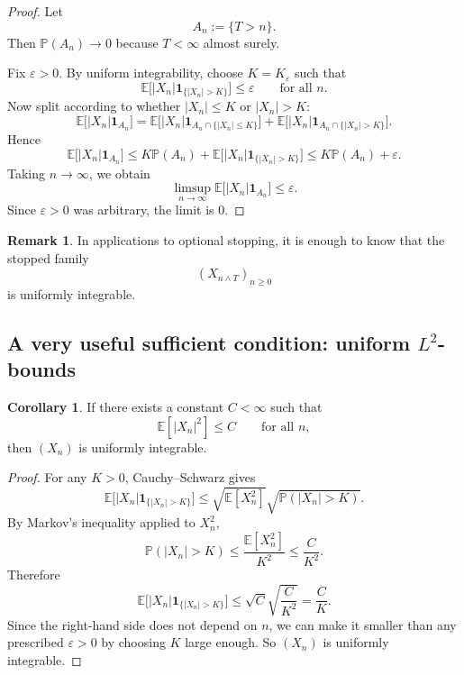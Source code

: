 \documentclass[11pt]{article}
\theoremstyle{definition}
\newtheorem{remark}[theorem]{Remark}
\newtheorem{corollary}[theorem]{Corollary}
\begin{document}
\begin{proof}
Let
\[
A_n:=\{T>n\}.
\]
Then \(\mathbb P(A_n)\to 0\) because \(T<\infty\) almost surely.

Fix \(\varepsilon>0\). By uniform integrability, choose \(K=K_\varepsilon\) such that
\[
\mathbb E\bigl[|X_n|\mathbf 1_{\{|X_n|>K\}}\bigr]\le \varepsilon
\qquad \text{for all } n.
\]
Now split according to whether \(|X_n|\le K\) or \(|X_n|>K\):
\[
\mathbb E\bigl[|X_n|\mathbf 1_{A_n}\bigr]
=
\mathbb E\bigl[|X_n|\mathbf 1_{A_n\cap\{|X_n|\le K\}}\bigr]
+
\mathbb E\bigl[|X_n|\mathbf 1_{A_n\cap\{|X_n|>K\}}\bigr].
\]
Hence
\[
\mathbb E\bigl[|X_n|\mathbf 1_{A_n}\bigr]
\le
K\mathbb P(A_n)
+
\mathbb E\bigl[|X_n|\mathbf 1_{\{|X_n|>K\}}\bigr]
\le
K\mathbb P(A_n)+\varepsilon.
\]
Taking \(n\to\infty\), we obtain
\[
\limsup_{n\to\infty}
\mathbb E\bigl[|X_n|\mathbf 1_{A_n}\bigr]
\le \varepsilon.
\]
Since \(\varepsilon>0\) was arbitrary, the limit is \(0\).
\end{proof}

\begin{remark}
In applications to optional stopping, it is enough to know that the stopped family
\[
(X_{n\wedge T})_{n\ge 0}
\]
is uniformly integrable.
\end{remark}

\subsection{A very useful sufficient condition: uniform \texorpdfstring{$L^2$}{L2}-bounds}

\begin{corollary}
If there exists a constant \(C<\infty\) such that
\[
\mathbb E[|X_n|^2]\le C
\qquad \text{for all } n,
\]
then \((X_n)\) is uniformly integrable.
\end{corollary}

\begin{proof}
For any \(K>0\), Cauchy--Schwarz gives
\[
\mathbb E\bigl[|X_n|\mathbf 1_{\{|X_n|>K\}}\bigr]
\le
\sqrt{\mathbb E[X_n^2]}
\sqrt{\mathbb P(|X_n|>K)}.
\]
By Markov's inequality applied to \(X_n^2\),
\[
\mathbb P(|X_n|>K)
\le
\frac{\mathbb E[X_n^2]}{K^2}
\le
\frac{C}{K^2}.
\]
Therefore
\[
\mathbb E\bigl[|X_n|\mathbf 1_{\{|X_n|>K\}}\bigr]
\le
\sqrt{C}\sqrt{\frac{C}{K^2}}
=
\frac{C}{K}.
\]
Since the right-hand side does not depend on \(n\), we can make it smaller than any prescribed \(\varepsilon>0\) by choosing \(K\) large enough. So \((X_n)\) is uniformly integrable.
\end{proof}
\end{document}
